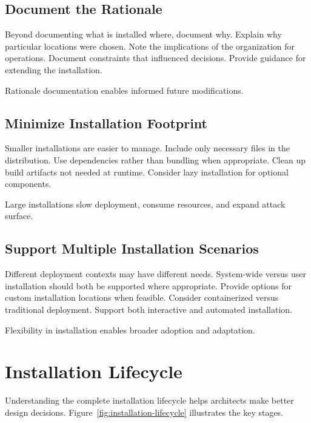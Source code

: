 \documentclass[11pt]{article}
\begin{document}
\subsection{Document the Rationale}

Beyond documenting what is installed where, document why. Explain why particular locations were chosen. Note the implications of the organization for operations. Document constraints that influenced decisions. Provide guidance for extending the installation.

Rationale documentation enables informed future modifications.

\subsection{Minimize Installation Footprint}

Smaller installations are easier to manage. Include only necessary files in the distribution. Use dependencies rather than bundling when appropriate. Clean up build artifacts not needed at runtime. Consider lazy installation for optional components.

Large installations slow deployment, consume resources, and expand attack surface.

\subsection{Support Multiple Installation Scenarios}

Different deployment contexts may have different needs. System-wide versus user installation should both be supported where appropriate. Provide options for custom installation locations when feasible. Consider containerized versus traditional deployment. Support both interactive and automated installation.

Flexibility in installation enables broader adoption and adaptation.

\section{Installation Lifecycle}

Understanding the complete installation lifecycle helps architects make better design decisions. Figure~\ref{fig:installation-lifecycle} illustrates the key stages.
\end{document}
